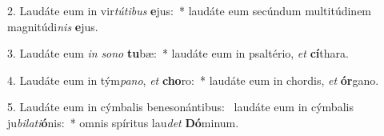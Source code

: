 2. Laudáte eum in vir\textit{tú}\textit{ti}\textit{bus} \textbf{e}jus:~*  laudáte eum secúndum multitúdinem magnitúdi\textit{nis} \textbf{e}jus.\

3. Laudáte eum \textit{in} \textit{so}\textit{no} \textbf{tu}bæ:~*  laudáte eum in psaltério, \textit{et} \textbf{cí}thara.\

4. Laudáte eum in tým\textit{pa}\textit{no}, \textit{et} \textbf{cho}ro:~*  laudáte eum in chordis, \textit{et} \textbf{ór}gano.\

5. Laudáte eum in cýmbalis benesonántibus: \dag\  laudáte eum in cýmbalis ju\textit{bi}\textit{la}\textit{ti}\textbf{ó}nis:~*  omnis spíritus lau\textit{det} \textbf{Dó}minum.\

